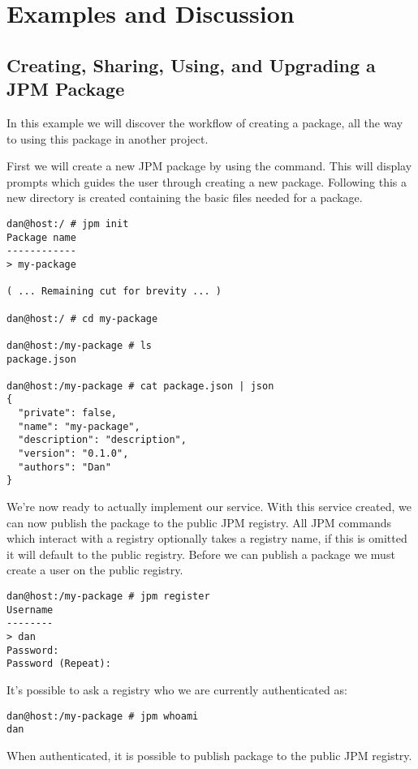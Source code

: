 \section{Examples and Discussion}

\subsection{Creating, Sharing, Using, and Upgrading a JPM Package}

In this example we will discover the workflow of creating a package, all the
way to using this package in another project.

First we will create a new JPM package by using the  command.
This will display prompts which guides the user through creating a new package.
Following this a new directory is created containing the basic files needed for
a package.

\begin{verbatim}
dan@host:/ # jpm init
Package name
------------
> my-package

( ... Remaining cut for brevity ... )

dan@host:/ # cd my-package

dan@host:/my-package # ls
package.json

dan@host:/my-package # cat package.json | json
{
  "private": false,
  "name": "my-package",
  "description": "description",
  "version": "0.1.0",
  "authors": "Dan"
}
\end{verbatim}

We're now ready to actually implement our service. With this service created,
    we can now publish the package to the public JPM registry. All JPM commands
    which interact with a registry optionally takes a registry name, if this is
    omitted it will default to the public registry.  Before we can publish a
    package we must create a user on the public registry.

\begin{verbatim}
dan@host:/my-package # jpm register
Username
--------
> dan
Password:
Password (Repeat):
\end{verbatim}

It's possible to ask a registry who we are currently authenticated as:

\begin{verbatim}
dan@host:/my-package # jpm whoami
dan
\end{verbatim}

When authenticated, it is possible to publish package to the public JPM
registry.

